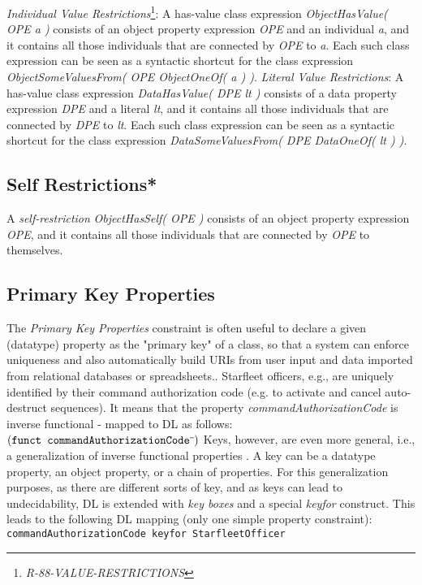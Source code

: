 \documentclass{llncs}
\newcommand{\ms}[1]{\texttt{#1}}
\begin{document}
\emph{Individual Value Restrictions}\footnote{\emph{R-88-VALUE-RESTRICTIONS}}: A has-value class expression \emph{ObjectHasValue( OPE a )} consists of an object property expression \emph{OPE} and an individual \emph{a}, and it contains all those individuals that are connected by \emph{OPE} to \emph{a}. Each such class expression can be seen as a syntactic shortcut for the class expression \emph{ObjectSomeValuesFrom( OPE ObjectOneOf( a ) )}. 
\emph{Literal Value Restrictions}: A has-value class expression \emph{DataHasValue( DPE lt )} consists of a data property expression \emph{DPE} and a literal \emph{lt}, and it contains all those individuals that are connected by \emph{DPE} to \emph{lt}. Each such class expression can be seen as a syntactic shortcut for the class expression \emph{DataSomeValuesFrom( DPE DataOneOf( lt ) )}.

\subsection{Self Restrictions*}

A \emph{self-restriction} \emph{ObjectHasSelf( OPE )} consists of an object property expression \emph{OPE}, and it contains all those individuals that are connected by \emph{OPE} to themselves. 

\subsection{Primary Key Properties}

The \emph{Primary Key Properties} constraint is often useful to declare a given (datatype) property as the "primary key" of a class, so that a system can enforce uniqueness and also automatically build URIs from user input and data imported from relational databases or spreadsheets.. 
Starfleet officers, e.g., are uniquely identified by their command authorization code (e.g. to activate and cancel auto-destruct sequences).
It means that the property \emph{commandAuthorizationCode} is inverse functional - mapped to DL as follows:
$(\ms{funct commandAuthorizationCode}\sp{\overline{\ }})$
Keys, however, are even more general, i.e., a generalization of inverse functional properties \cite{Schneider2009}.
A key can be a datatype property, an object property, or a chain of properties.
For this generalization purposes, as there are different sorts of key, and as keys can lead to undecidability, 
DL is extended with \emph{key boxes} and a special \emph{keyfor} construct\cite{Lutz2005}.
This leads to the following DL mapping (only one simple property constraint):
\ms{commandAuthorizationCode \ms{keyfor} StarfleetOfficer}
\end{document}
